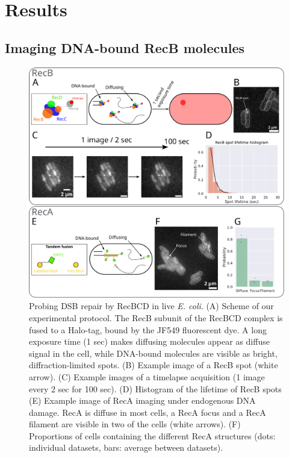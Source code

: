 \section*{Results}

\subsection*{Imaging DNA-bound RecB molecules}

\begin{figure}[htbp]
\begin{center}
\includegraphics[width=\textwidth]{Figures/Fig1_endogenous.pdf}
\end{center}
\caption{Probing DSB repair by RecBCD in live \textit{E. coli}. (A) Scheme of our experimental protocol. The RecB subunit of the RecBCD complex is fused to a Halo-tag, bound by the JF549 fluorescent dye. A long exposure time (1 sec) makes diffusing molecules appear as diffuse signal in the cell, while DNA-bound molecules are visible as bright, diffraction-limited spots. (B) Example image of a RecB spot (white arrow). (C) Example images of a timelapse acquisition (1 image every 2 sec for 100 sec). (D) Histogram of the lifetime of RecB spots (E) Example image of RecA imaging under endogenous DNA damage. RecA is diffuse in most cells, a RecA focus and a RecA filament are visible in two of the cells (white arrows). (F) Proportions of cells containing the different RecA structures (dots: individual datasets, bars: average between datasets).}
\label{Fig:endogenous}
\end{figure}

